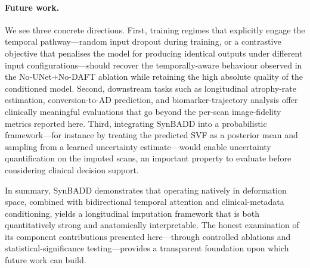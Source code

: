\paragraph{Future work.} We see three concrete directions. First, training regimes that explicitly engage the temporal pathway---random input dropout during training, or a contrastive objective that penalises the model for producing identical outputs under different input configurations---should recover the temporally-aware behaviour observed in the No-UNet$+$No-DAFT ablation while retaining the high absolute quality of the conditioned model. Second, downstream tasks such as longitudinal atrophy-rate estimation, conversion-to-AD prediction, and biomarker-trajectory analysis offer clinically meaningful evaluations that go beyond the per-scan image-fidelity metrics reported here. Third, integrating SynBADD into a probabilistic framework---for instance by treating the predicted SVF as a posterior mean and sampling from a learned uncertainty estimate---would enable uncertainty quantification on the imputed scans, an important property to evaluate before considering clinical decision support.

In summary, SynBADD demonstrates that operating natively in deformation space, combined with bidirectional temporal attention and clinical-metadata conditioning, yields a longitudinal imputation framework that is both quantitatively strong and anatomically interpretable. The honest examination of its component contributions presented here---through controlled ablations and statistical-significance testing---provides a transparent foundation upon which future work can build.
